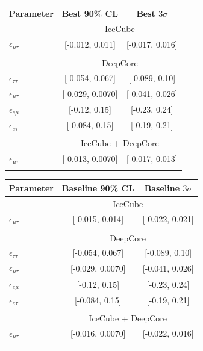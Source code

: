 \documentclass{revtex4-2}
\newcommand{\emt}{\ensuremath{\epsilon_{\mu\tau}}}
\newcommand{\eet}{\epsilon_{e\tau}}
\newcommand{\eem}{\epsilon_{e\mu}}
\newcommand{\ett}{\ensuremath{\epsilon_{\tau\tau}}}
\begin{document}
{ {\renewcommand{\arraystretch}{1.0}
  \begin{table}
    \begin{center}
       \begin{tabular}{lcc}
          \hline
          Parameter & Best 90\% CL & Best $3\sigma$\\
          \hline & \multicolumn{2}{c}{IceCube}  \\
          $\emt$ &  [-0.012, 0.011] &  [-0.017, 0.016] \\\\
          & \multicolumn{2}{c}{DeepCore}\\ [0.3em]
          $\ett$ &  [-0.054, 0.067] &  [-0.089, 0.10] \\
          $\emt$ &  [-0.029, 0.0070] &  [-0.041, 0.026] \\
          $\eem$ &  [-0.12, 0.15] &  [-0.23, 0.24] \\
          $\eet$ &   [-0.084, 0.15] &  [-0.19, 0.21] \\\\
          &\multicolumn{2}{c}{IceCube + DeepCore} \\
          $\emt$ &  [-0.013, 0.0070] &  [-0.017, 0.013] \\
          \hline
          \vspace{2em}
       \end{tabular}
       \begin{tabular}{lcc}
          \hline
          Parameter & Baseline 90\% CL & Baseline $3\sigma$ \\
          \hline & \multicolumn{2}{c}{IceCube}  \\
          $\emt$ &  [-0.015, 0.014] &  [-0.022, 0.021] \\\\
          & \multicolumn{2}{c}{DeepCore}\\ [0.3em]
          $\ett$ &  [-0.054, 0.067] &  [-0.089, 0.10] \\
          $\emt$ &  [-0.029, 0.0070] &  [-0.041, 0.026] \\
          $\eem$ &  [-0.12, 0.15] &  [-0.23, 0.24] \\
          $\eet$ &   [-0.084, 0.15] &  [-0.19, 0.21] \\\\
          &\multicolumn{2}{c}{IceCube + DeepCore}\\
          $\emt$ &  [-0.016, 0.0070] &  [-0.022, 0.016] \\
          \hline
          \vspace{2em}

\end{tabular}
\end{center}
\end{table}}}
\end{document}
